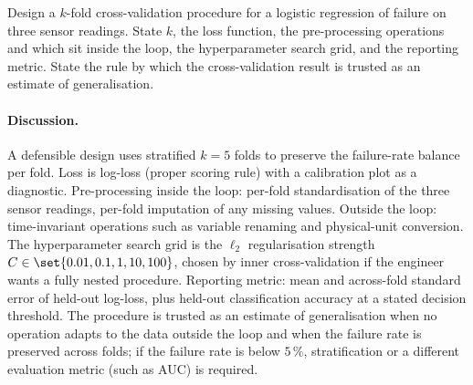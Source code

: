 \begin{exercise}
Design a $k$-fold cross-validation procedure for a logistic
regression of failure on three sensor readings. State $k$, the
loss function, the pre-processing operations and which sit inside
the loop, the hyperparameter search grid, and the reporting
metric. State the rule by which the cross-validation result is
trusted as an estimate of generalisation.

\paragraph{Discussion.} A defensible design uses stratified
$k = 5$ folds to preserve the failure-rate balance per fold.
Loss is log-loss (proper scoring rule) with a calibration plot
as a diagnostic. Pre-processing inside the loop: per-fold
standardisation of the three sensor readings, per-fold imputation
of any missing values. Outside the loop: time-invariant
operations such as variable renaming and physical-unit
conversion. The hyperparameter search grid is the $\ell_{2}$
regularisation strength $C \in \set{0.01, 0.1, 1, 10, 100}$,
chosen by inner cross-validation if the engineer wants a
fully nested procedure. Reporting metric: mean and across-fold
standard error of held-out log-loss, plus held-out classification
accuracy at a stated decision threshold. The procedure is
trusted as an estimate of generalisation when no operation
adapts to the data outside the loop and when the failure rate
is preserved across folds; if the failure rate is below
$5\,\%$, stratification or a different evaluation metric (such
as AUC) is required.
\end{exercise}

